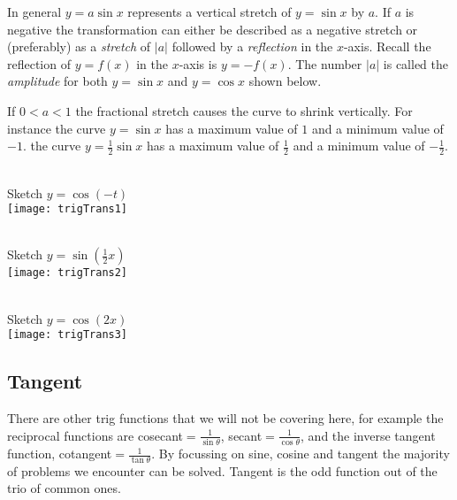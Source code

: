 In general $y =a \sin  x$ represents a vertical stretch of $y =\sin  x$ by $a$. If $a$ is negative the transformation can either be described as a negative stretch or (preferably) as a \emph{stretch}
of $\left \vert a\right \vert $ followed by a \emph{reflection} in the $x$-axis. Recall the reflection of $y =f \left (x\right )$ in the $x$-axis is $y = -f \left (x\right )$. The number $\left \vert a\right \vert $ is called the \emph{amplitude} for both $y =\sin  x$ and $y =\cos  x$ shown below. 

If $0 <a <1$ the fractional stretch causes the curve to shrink vertically. For instance the curve
$y =\sin  x$ has a maximum value of $1$ and a minimum value of $ -1$. the curve $y =\frac{1}{2} \sin  x$ has a maximum value of $\frac{1}{2}$ and a minimum value of $ -\frac{1}{2}$. 
\columnsep=10pt
\begin{multicols}{3}
\example  \medskip\\Sketch $y =\cos  ( -t)$\\ 
\texttt{[image: trigTrans1]}

\columnbreak

\example \medskip\\Sketch $y =\sin \left( \frac{1}{2}x\right)$\\
\texttt{[image: trigTrans2]}
\columnbreak

\example \medskip\\Sketch $y =\cos(2x)$\\
\texttt{[image: trigTrans3]}
\end{multicols}

\subsection*{Tangent}
 There are other trig functions that we will not be covering here, for example the reciprocal functions are cosecant$=\frac{1}{\sin\theta}$, secant$=\frac{1}{\cos\theta}$, and the inverse tangent function, cotangent$=\frac{1}{\tan\theta}$. By focussing on sine, cosine and tangent the majority of problems we encounter can be solved. Tangent is the odd function out of the trio of common ones.

